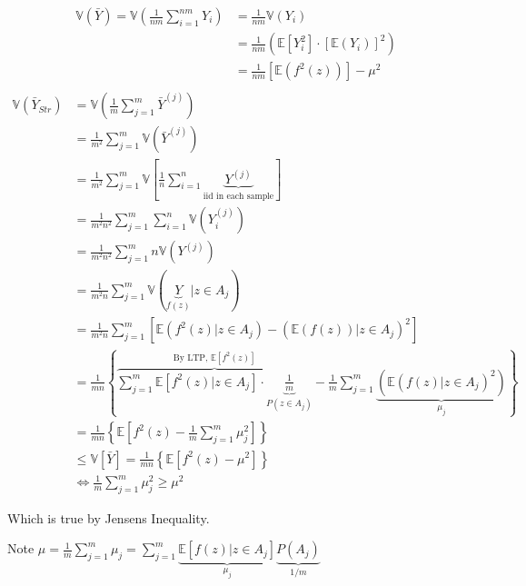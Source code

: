 \documentclass[
  oneside]{book}
\begin{document}
\[
\begin{aligned}
\mathbb{V}(\bar{Y}) = \mathbb{V}\left( \frac{1}{nm} \sum^{nm}_{i=1} Y_{i} \right) &= \frac{1}{nm} \mathbb{V}(Y_{i})\\
&= \frac{1}{nm} \left( \mathbb{E}[Y_{i}^{2}] \cdot [\mathbb{E}(Y_{i})]^{2} \right) \\
&= \frac{1}{nm} \left[ \mathbb{E}(f^{2}(z)) \right] - \mu^{2}\\
\end{aligned}
\]
\[
\begin{aligned}
\mathbb{V}(\bar{Y}_{Str}) &= \mathbb{V}\left( \frac{1}{m} \sum^{m}_{j=1} \bar{Y}^{(j)} \right) \\
&= \frac{1}{m^{2}} \sum^{m}_{j=1} \mathbb{V}(\bar{Y}^{(j)})\\
&= \frac{1}{m^{2}} \sum^{m}_{j=1} \mathbb{V}\left[ \frac{1}{n} \sum^{n}_{i=1} \underbrace{ Y^{(j)} }_{ \text{iid in each sample} } \right] \\
&= \frac{1}{m^{2}n^{2}} \sum^{m}_{j=1} \sum^{n}_{i=1} \mathbb{V}\left( Y_{i}^{(j)} \right) \\
&= \frac{1}{m^{2}n^{2}} \sum^{m}_{j=1} n\mathbb{V}(Y^{(j)})\\
&= \frac{1}{m^{2}n} \sum^{m}_{j=1} \mathbb{V}(\underbrace{ Y }_{ f(z) }|z\in A_{j})\\
&= \frac{1}{m^{2}n} \sum^{m}_{j=1}\left[ \mathbb{E} \left( f^{2}(z)|z \in A_{j} \right) - \left( \mathbb{E}(f(z))|z \in A_{j} \right)^{2} \right] \\
&= \frac{1}{mn} \left\{ \overbrace{ \sum^{m}_{j=1}\mathbb{E}\left[ f^{2}(z)|z \in A_{j} \right] \cdot \underbrace{ \frac{1}{m} }_{ P(z\in A_{j}) } }^{ \text{By LTP, } \mathbb{E}[f^{2}(z)] } - \frac{1}{m} \sum^{m}_{j=1} \underbrace{ \left( \mathbb{E}(f(z)|z \in A_{j})^{2} \right) }_{ \mu_{j} }  \right\}\\
&= \frac{1}{mn} \left\{ \mathbb{E}\left[ f^{2}(z) - \frac{1}{m}\sum^{m}_{j=1}\mu_{j}^{2}  \right]  \right\} \\
&\leq \mathbb{V}\left[ \bar{Y} \right] = \frac{1}{mn}\left\{ \mathbb{E}\left[ f^{2}(z)-\mu^{2} \right]  \right\} \\
&\iff \frac{1}{m} \sum^{m}_{j=1} \mu_{j}^{2} \geq \mu^{2}
\end{aligned} 
\]

Which is true by Jensens Inequality.

Note \(\mu = \frac{1}{m} \sum^{m}_{j=1}\mu_{j} = \sum^{m}_{j=1}\underbrace{ \mathbb{E}\left[ f(z)|z\in A_{j} \right] }_{ \mu_{j} }\underbrace{ P(A_{j}) }_{ 1/m }\)
\end{document}
